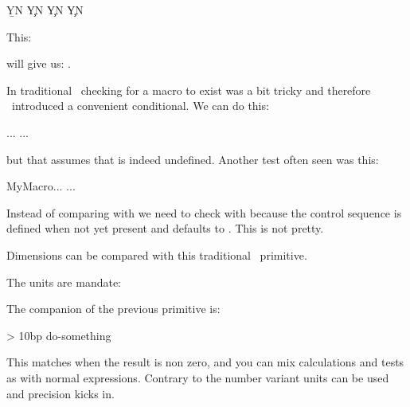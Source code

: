 \typebuffer[a]

\startbuffer[b]
\ifcstok\a\b   Y\else N\fi\space
\ifcstok\a\c   Y\else N\fi\space
\ifcstok{\a}\c Y\else N\fi\space
{}\c  Y\else N\fi
\stopbuffer

This:

\typebuffer[b]

{\getbuffer[a]will give us: \inlinebuffer[b].}

\stopnewprimitive

\startoldprimitive[title={\prm {ifdefined}}]

In traditional \TEX\ checking for a macro to exist was a bit tricky and therefore
\ETEX\ introduced a convenient conditional. We can do this:

\starttyping
\ifx\MyMacro\undefined ... \else ... \fi
\stoptyping

but that assumes that \type {\undefined} is indeed undefined. Another test often
seen was this:

\starttyping
\expandafter\ifx\csname MyMacro\endcsname\relax ... \else ... \fi
\stoptyping

Instead of comparing with \type {\undefined} we need to check with 
because the control sequence is defined when not yet present and defaults to
. This is not pretty.

\stopoldprimitive

\startoldprimitive[title={\prm {ifdim}}]

Dimensions can be compared with this traditional \TEX\ primitive.

\startbuffer
\scratchdimen=1pt 

\ifdim\scratchdimen=\scratchcounter sp YES \else NOP\fi
\ifdim\scratchdimen=1               pt YES \else NOP\fi
\stopbuffer

\typebuffer

The units are mandate:

{\getbuffer}

\stopoldprimitive

\startnewprimitive[title={\prm {ifdimexpression}}]

The companion of the previous primitive is:

\startbuffer
\ifdimexpression 10pt > 10bp \relax
    do-something
\fi
\stopbuffer

This matches when the result is non zero, and you can mix calculations and tests
as with normal expressions. Contrary to the number variant units can be used and
precision kicks in.

